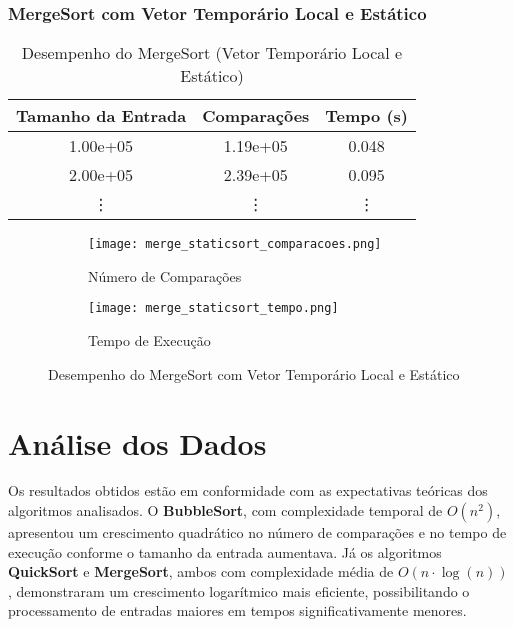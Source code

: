 \documentclass[a4paper,12pt]{article}
\begin{document}
\subsubsection{MergeSort com Vetor Temporário Local e Estático}

\begin{table}[H]
    \centering
    \caption{Desempenho do MergeSort (Vetor Temporário Local e Estático)}
    \begin{tabular}{@{}ccc@{}}
        \toprule
        \textbf{Tamanho da Entrada} & \textbf{Comparações} & \textbf{Tempo (s)} \\ \midrule
        1.00e+05                      & 1.19e+05        & 0.048            \\
        2.00e+05                      & 2.39e+05        & 0.095            \\
        \vdots                       & \vdots               & \vdots             \\
        \bottomrule
    \end{tabular}
    \label{tab:mergesort_static}
\end{table}

\begin{figure}[H]
    \centering
    \begin{subfigure}[b]{0.6\textwidth} %
        \texttt{[image: merge\_staticsort\_comparacoes.png]}
        \caption{Número de Comparações}
        \label{fig:merge_staticsort_comparacoes}
    \end{subfigure}
    \hfill
    \begin{subfigure}[b]{0.6\textwidth} %
        \texttt{[image: merge\_staticsort\_tempo.png]}
        \caption{Tempo de Execução}
        \label{fig:merge_staticsort_tempo}
    \end{subfigure}
    \caption{Desempenho do MergeSort com Vetor Temporário Local e Estático}
    \label{fig:mergesort_static}
\end{figure}

\section{Análise dos Dados}

Os resultados obtidos estão em conformidade com as expectativas teóricas dos algoritmos analisados. O \textbf{BubbleSort}, com complexidade temporal de \(O(n^2)\), apresentou um crescimento quadrático no número de comparações e no tempo de execução conforme o tamanho da entrada aumentava. Já os algoritmos \textbf{QuickSort} e \textbf{MergeSort}, ambos com complexidade média de \(O(n \cdot \log(n))\), demonstraram um crescimento logarítmico mais eficiente, possibilitando o processamento de entradas maiores em tempos significativamente menores.
\end{document}
